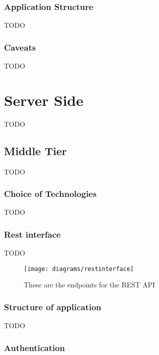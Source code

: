 \subsubsection*{Application Structure}

{TODO}

\subsubsection*{Caveats}

{TODO}




\section{Server Side}

{TODO}

\subsection{Middle Tier}

{TODO}

\subsubsection*{Choice of Technologies}
\label{sec:node_choice_of_tech}

{TODO}

\subsubsection*{Rest interface}

{TODO}

\begin{figure}[H]
    \centering
    \texttt{[image: diagrams/restinterface]}
    \caption{These are the endpoints for the REST API}
    \label{fig:rest_pai_diagram_image}
\end{figure} 
\noindent

\subsubsection*{Structure of application}

{TODO}

\subsubsection*{Authentication}

